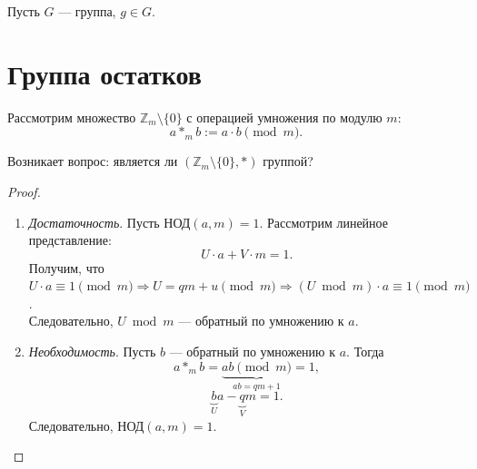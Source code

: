 \documentclass[12pt,a4paper]{report}
\begin{document}
Пусть $G$ --- группа, $g\in G$.


\example{}

\section{Группа остатков}

Рассмотрим множество $\mathbb{Z}_m\setminus\{0\}$ с операцией умножения по модулю $m$:
\[
a *_m b := a\cdot b \pmod m.
\]

Возникает вопрос: является ли $(\mathbb{Z}_m\setminus\{0\}, *)$ группой?

\example{}

\begin{proof}
    \begin{enumerate}
        \item[$\Longleftarrow$] \textit{Достаточность}. 
        Пусть $\text{НОД}(a,m)=1$. Рассмотрим линейное представление:
        \[
        U\cdot a+V\cdot m = 1.
        \]
        Получим, что $U\cdot a \equiv 1 \pmod{m} \Rightarrow U=qm+u\pmod m\Rightarrow (U\bmod m)\cdot a\equiv 1\pmod m$.\\ 
        Следовательно, $U\bmod m$ --- обратный по умножению к $a$.

        \item[$\Longrightarrow$] \textit{Необходимость}. 
        Пусть $b$ --- обратный по умножению к $a$. Тогда
        \[
        a *_m b = \underbrace{ab\pmod m}_{ab=qm+1}=1,
        \]
        \[
        \underbrace{b}_U a - \underbrace{q}_V m = 1.
        \]
        Следовательно, $\text{НОД}(a,m)=1$.
    \end{enumerate}
\end{proof}
\end{document}
